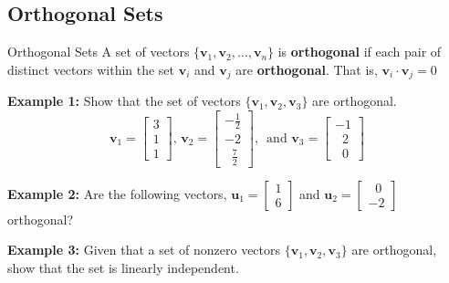 \documentclass[10pt, aspectratio=169]{beamer}
\begin{document}
\subsection{Orthogonal Sets}
\begin{frame}{Orthogonal Sets}
A set of vectors \(\{\mathbf{v}_1, \mathbf{v}_2, \ldots,\mathbf{v}_n \}\) is \textbf{orthogonal} if each pair of distinct vectors within the set \(\mathbf{v}_i\) and \(\mathbf{v}_j\) are \textbf{orthogonal}.
That is, \(\mathbf{v}_i\cdot \mathbf{v}_j=0\)

\vspace{0.25cm}

\textbf{Example 1:} Show that the set of vectors \(\{\mathbf{v}_1, \mathbf{v}_2, \mathbf{v}_3\}\) are orthogonal.
\[\mathbf{v}_1 =\begin{bmatrix} 3\\1 \\ 1 \end{bmatrix}, \,\mathbf{v}_2 =\begin{bmatrix} -\frac{1}{2}\\-2 \\ \;\;\frac{7}{2} \end{bmatrix},\, \text{ and } 
\mathbf{v}_3 =\begin{bmatrix} -1\\\;\;2 \\ \;\;0 \end{bmatrix}\]

\vspace{0.25cm}

\textbf{Example 2:} Are the following  vectors, \(\mathbf{u}_1 =\begin{bmatrix} 1 \\ 6 \end{bmatrix}\) and 
\(\mathbf{u}_2 =\begin{bmatrix} \;\;0 \\-2 \end{bmatrix}\) orthogonal?

\vspace{0.3cm}

\textbf{Example 3:} Given that a set of nonzero vectors \(\{\mathbf{v}_1, \mathbf{v}_2, \mathbf{v}_3\}\) are orthogonal, show that the set is linearly independent.

\end{frame}
\end{document}
